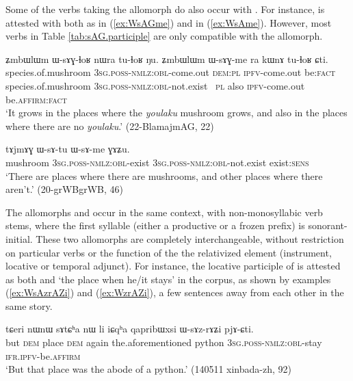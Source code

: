 Some of the verbs taking the  allomorph do also occur with . For instance,  is attested with both  as in (\ref{ex:WsAGme}) and  in (\ref{ex:WsAme}). However, most verbs in Table \ref{tab:sAG.participle} are only compatible with the  allomorph.

\begin{exe}
\ex \label{ex:WsAGme}
\gll ʑmbɯlɯm ɯ-sɤɣ-ɬoʁ nɯra tu-ɬoʁ ŋu. ʑmbɯlɯm ɯ-sɤɣ-me ra kɯnɤ tu-ɬoʁ ɕti. \\
species.of.mushroom \textsc{3sg}.\textsc{poss}-\textsc{nmlz}:\textsc{obl}-come.out \textsc{dem}:\textsc{pl} \textsc{ipfv}-come.out be:\textsc{fact} species.of.mushroom \textsc{3sg}.\textsc{poss}-\textsc{nmlz}:\textsc{obl}-not.exist \ \textsc{pl} also \textsc{ipfv}-come.out be.\textsc{affirm}:\textsc{fact} \\
\glt `It grows in the places where the \textit{youlaku} mushroom grows, and also in the places where there are no \textit{youlaku}.'  (22-BlamajmAG, 22)
\end{exe}

 \begin{exe}
\ex \label{ex:WsAme}
\gll tɤjmɤɣ ɯ-sɤ-tu ɯ-sɤ-me ɣɤʑu. \\
mushroom \textsc{3sg}.\textsc{poss}-\textsc{nmlz}:\textsc{obl}-exist  \textsc{3sg}.\textsc{poss}-\textsc{nmlz}:\textsc{obl}-not.exist  exist:\textsc{sens} \\
\glt `There are places where there are mushrooms, and other places where there aren't.' (20-grWBgrWB, 46)
\end{exe}

The allomorphs  and  occur in the same context, with non-monosyllabic verb stems, where the first syllable (either a productive or a frozen prefix) is sonorant-initial. These two allomorphs are completely interchangeable, without restriction on particular verbs or the function of the the relativized element (instrument, locative or temporal adjunct). For instance, the locative participle of  is attested as both  and  `the place when he/it stays' in the corpus, as shown by examples (\ref{ex:WsAzrAZi}) and (\ref{ex:WzrAZi}), a few sentences away from each other in the same story.

\begin{exe}
\ex \label{ex:WsAzrAZi}
\gll  tɕeri nɯnɯ sɤtɕʰa nɯ li iɕqʰa qapribɯxsi ɯ-sɤz-rɤʑi pjɤ-ɕti. \\
but \textsc{dem} place \textsc{dem} again the.aforementioned python \textsc{3sg}.\textsc{poss}-\textsc{nmlz}:\textsc{obl}-stay \textsc{ifr}.\textsc{ipfv}-be.\textsc{affirm} \\
\glt `But that place was the abode of a python.' (140511 xinbada-zh, 92)
\end{exe}

